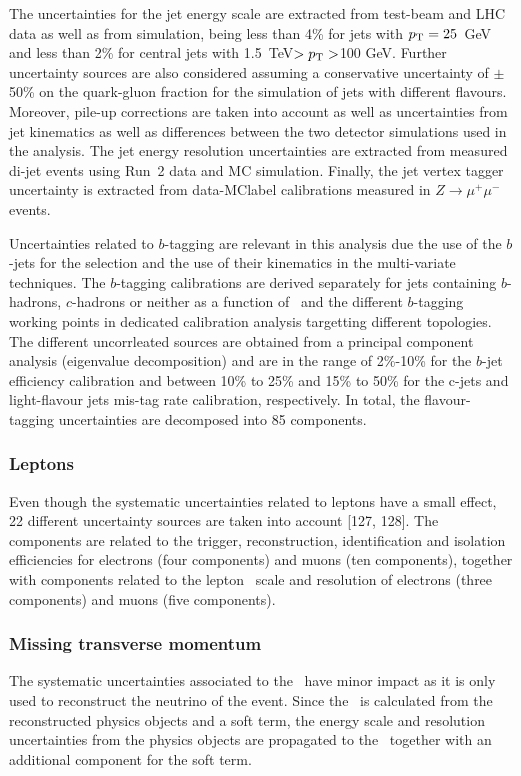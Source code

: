 The uncertainties for the jet energy scale are extracted from test-beam and LHC data as well as from simulation, being less than 4\% for jets with $p_{\text{T}}=25$~GeV and less than 2\% for central jets with 1.5~TeV$>p_{\text{T}}>$100 GeV. Further uncertainty sources are also considered assuming a conservative uncertainty of $\pm$50\% on the quark-gluon fraction for the simulation of jets with different flavours. Moreover, pile-up corrections are taken into account as well as uncertainties from jet kinematics as well as differences between the two detector simulations used in the analysis. The jet energy resolution uncertainties are extracted from measured di-jet events using Run~2 data and MC simulation. Finally, the jet vertex tagger uncertainty is extracted from data-\acrshort{MClabel} calibrations measured %
in $Z\to\mu^+\mu^-$ events.

Uncertainties related to $b$-tagging are relevant in this analysis due the use of the $b$-jets for the selection and the use of their kinematics in the multi-variate techniques. The $b$-tagging calibrations are derived separately for jets containing $b$-hadrons, $c$-hadrons or neither as a function of \pT\ and the different $b$-tagging working points in dedicated calibration analysis targetting different topologies. The different uncorrleated sources are obtained from a principal component analysis (eigenvalue decomposition) and are in the range of 2\%-10\% for the $b$-jet efficiency calibration and between 10\% to 25\% and
15\% to 50\% for the c-jets and light-flavour jets mis-tag rate calibration, respectively. In total, the flavour-tagging uncertainties are decomposed into 85 components.

\subsubsection{Leptons}
Even though the systematic uncertainties related to leptons have a small effect, 22 different uncertainty sources are taken into account [127, 128]. %
The components are related to the trigger, reconstruction, identification and isolation efficiencies for electrons (four components) and muons (ten components), together with components related to the lepton \pT\ scale and resolution of electrons (three components) and muons (five components).

\subsubsection{Missing transverse momentum}
The systematic uncertainties associated to the \MET\ have minor impact as it is only used to reconstruct the neutrino of the event. Since the \MET\ is calculated from the reconstructed physics objects and a soft term, the energy scale and resolution uncertainties from the physics objects are propagated to the \MET\ together with an additional component for the soft term. 

